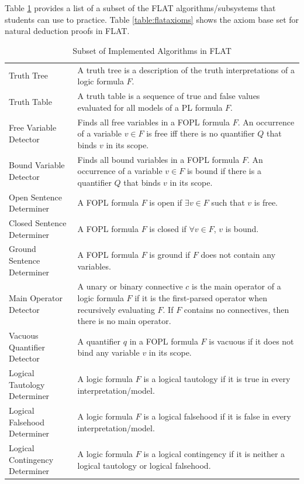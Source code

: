 \documentclass[ms]{uncgdissertationexp2}
\theoremstyle{plain}
\theoremstyle{definition}
\theoremstyle{remark}
\begin{document}
Table \ref{table:flat} provides a list of a subset of the FLAT algorithms/subsystems that students can use to practice. Table \ref{table:flataxioms} shows the axiom base set for natural deduction proofs in FLAT.

\begin{table}
	\caption{Subset of Implemented Algorithms in FLAT}
	\label{table:flat}
	\small
	\begin{tabular}{p{3cm}p{11cm}}
	  \toprule
	  \thead{Algorithm}&\thead{Definition}\\
	  \midrule
	  Truth Tree&A truth tree is a description of the truth interpretations of a logic formula $F$.\\
	  Truth Table&A truth table is a sequence of true and false values evaluated for all models of a PL formula $F$.\\
	  Free Variable Detector&Finds all free variables in a FOPL formula $F$. An occurrence of a variable $v \in F$ is free iff there is no quantifier $Q$ that binds $v$ in its scope.\\
	  Bound Variable Detector&Finds all bound variables in a FOPL formula $F$. An occurrence of a variable $v \in F$ is bound if there is a quantifier $Q$ that binds $v$ in its scope.\\
	  Open Sentence Determiner&A FOPL formula $F$ is open if $\exists{v} \in F$ such that $v$ is free.\\
	  Closed Sentence Determiner&A FOPL formula $F$ is closed if $\forall{v} \in F$, $v$ is bound.\\
	  Ground Sentence Determiner&A FOPL formula $F$ is ground if $F$ does not contain any variables.\\
	  Main Operator Detector&A unary or binary connective $c$ is the main operator of a logic formula $F$ if it is the first-parsed operator when recursively evaluating $F$. If $F$ contains no connectives, then there is no main operator.\\
	  Vacuous Quantifier Detector&A quantifier $q$ in a FOPL formula $F$ is vacuous if it does not bind any variable $v$ in its scope.\\
	  Logical Tautology Determiner&A logic formula $F$ is a logical tautology if it is true in every interpretation/model.\\
	  Logical Falsehood Determiner&A logic formula $F$ is a logical falsehood if it is false in every interpretation/model.\\
	  Logical Contingency Determiner&A logic formula $F$ is a logical contingency if it is neither a logical tautology or logical falsehood.\\

\end{tabular}
\end{table}
\end{document}
